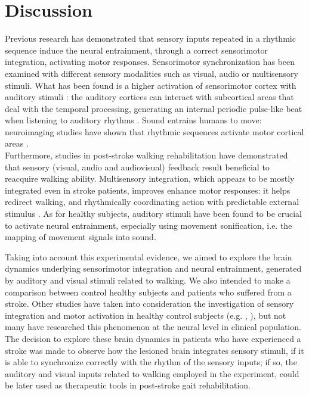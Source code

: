 \chapter{Discussion}
Previous research has demonstrated that sensory inputs repeated in a rhythmic sequence induce the neural entrainment, through a correct sensorimotor integration, activating motor responses. Sensorimotor synchronization has been examined with different sensory modalities such as visual, audio or multisensory stimuli. What has been found is a higher activation of sensorimotor cortex with auditory stimuli \parencite{Joris_2024}: the auditory cortices can interact with subcortical areas that deal with the temporal processing, generating an internal periodic pulse-like beat when listening to auditory rhythms \parencite{Nozaradan_2017}. Sound entrains humans to move: neuroimaging studies have shown that rhythmic sequences activate motor cortical areas \parencite{Grahn_2007}. \\
Furthermore, studies in post-stroke walking rehabilitation have demonstrated that sensory (visual, audio and audiovisual) feedback result beneficial to reacquire walking ability. Multisensory integration, which appears to be mostly integrated even in stroke patients, improves enhance motor responses: it helps redirect walking, and rhythmically coordinating action with predictable external stimulus \parencite{Bolognini_2016}. As for healthy subjects, auditory stimuli have been found to be crucial to activate neural entrainment, especially using movement sonification, i.e. the mapping of movement signals into sound.

Taking into account this experimental evidence, we aimed to explore the brain dynamics underlying sensorimotor integration and neural entrainment, generated by auditory and visual stimuli related to walking. We also intended to make a comparison between control healthy subjects and patients who suffered from a stroke. Other studies have taken into consideration the investigation of sensory integration and motor activation in healthy control subjects (e.g. \parencite{Nozaradan_2011}, \parencite{Nozaradan_2014}), but not many have researched this phenomenon at the neural level in clinical population. \\
The decision to explore these brain dynamics in patients who have experienced a stroke was made to observe how the lesioned brain integrates sensory stimuli, if it is able to synchronize correctly with the rhythm of the sensory inputs; if so, the auditory and visual inputs related to walking employed in the experiment, could be later used as therapeutic tools in post-stroke gait rehabilitation. 

